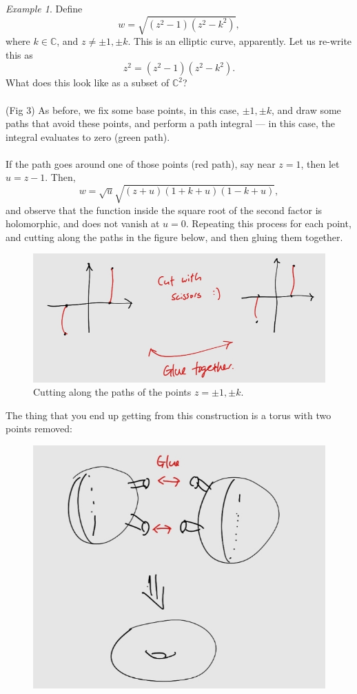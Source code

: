 \documentclass[a4paper]{report}
\theoremstyle{definition}
\theoremstyle{remark}
\theoremstyle{proposition}
\theoremstyle{conjecture}
\theoremstyle{lemma}
\theoremstyle{corollary}
\theoremstyle{exercise}
\theoremstyle{example}
\newtheorem{example}{Example}
\newcommand{\C}{\mathbb{C}}
\begin{document}
\begin{example}
    Define $$w = \sqrt{(z^2-1)(z^2-k^2)},$$
    where $k \in \C$, and $z\neq \pm1,\pm k$.
    This is an elliptic curve, apparently. 
    Let us re-write this as 
    $$z^2 = (z^2-1)(z^2-k^2).$$
    What does this look like as a subset of $\C^2$?\\\\
    (Fig 3) As before, we fix some base points, in this case, $\pm 1,\pm k$,
    and draw some paths that avoid these points, and perform a path integral 
    --- in this case, the integral evaluates to zero (green path). \\\\
    If the path goes around one of those points (red path), say near $z=1$,
    then let $u=z-1$. Then, 
    $$w = \sqrt{u} \sqrt{(z+u)(1+k+u)(1-k+u)},$$
    and observe that the function inside the square root of the second 
    factor is holomorphic, and does not vanish at $u=0$. 
    Repeating this process for each point, and cutting along the paths
    in the figure below, and then gluing them together. 
    \begin{figure}[h!]
        \centering
        \includegraphics[scale=0.25]{fig4.jpg}
        \caption{Cutting along the paths of the points $z=\pm1,\pm k$.}
    \end{figure}
    The thing that you end up 
    getting from this construction is a torus with two points removed:
    \begin{figure}[h!]
        \centering
        \includegraphics[scale=0.25]{fig5.jpg}

\end{figure}
\end{example}
\end{document}

